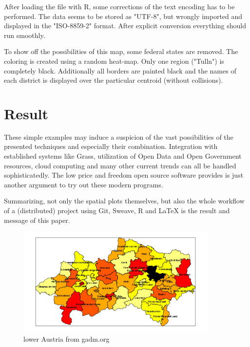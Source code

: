 \documentclass{ifacconf}
\begin{document}
After loading the file with R, some corrections of the text encoding has
to be performed. The data seems to be stored as "UTF-8", but wrongly
imported and displayed in the "ISO-8859-2" format. After explicit conversion
everything should run smoothly.

To show off the possibilities of this map, some federal states are removed. 
The coloring is created using a random heat-map. Only one region ("Tulln")
is completely black. Additionally all borders are painted black and the names
of each district is displayed over the particular centroid (without collisions).



\section{Result}
These simple examples 
may induce a suspicion of the vast possibilities of the presented techniques and 
especially their combination. Integration with established systems like Grass,
utilization of Open Data and Open Government resources, cloud computing and many other 
current trends can all be handled sophisticatedly. The low price and
freedom open source software provides is just another argument to try out
these modern programs.

Summarizing, not only the spatial plots themselves, but also the whole workflow
of a (distributed) project using Git, Sweave, R and LaTeX is the result and 
message of this paper.



\begin{figure}[h]
\begin{center}
\includegraphics[width=10cm]{pics/northAustria.png}    %
\caption{lower Austria from gadm.org} 
\label{fig:noe}
\end{center}
\end{figure}

   
\end{document}
